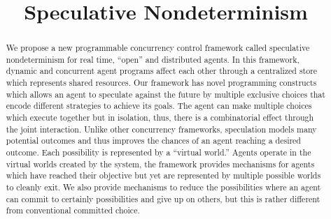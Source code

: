 \documentclass[preprint]{sigplanconf}
\title{Speculative Nondeterminism}
\begin{document}
\maketitle

\begin{abstract}
We propose a new programmable concurrency control framework called
speculative nondeterminism for real time,
``open'' and distributed agents. 
In this framework, dynamic and concurrent agent programs 
affect each other through a centralized store which represents shared resources.
Our framework has novel programming constructs which
allows an agent to speculate against the future by multiple
exclusive choices that encode different strategies to achieve its goals.
The agent can make multiple choices which execute together but in isolation,
thus, there is a combinatorial effect through the joint interaction.
Unlike other concurrency frameworks, speculation models many potential
outcomes and thus improves the chances of an agent reaching a desired outcome.
Each possibility is represented by a ``virtual world.''
Agents operate in the virtual worlds created by the system,
the framework provides mechanisms for agents which have reached their
objective but yet are represented by multiple possible worlds to cleanly
exit. We also provide mechanisms to reduce the possibilities where an
agent can commit to certainly possibilities and give up on others, but
this is rather different from conventional committed choice.

\end{abstract}
\end{document}
